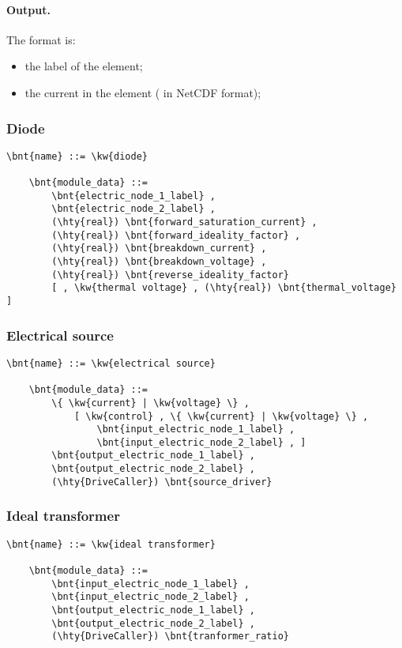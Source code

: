\paragraph{Output.}
\label{sec:MODULE:FAB-ELECTRIC:CAPACITOR:OUTPUT}
The format is:
\begin{itemize}
\item the label of the element;
\item the current in the element ( in NetCDF format);
\end{itemize}


\subsubsection{Diode}
\begin{Verbatim}[commandchars=\\\{\}]
    \bnt{name} ::= \kw{diode}

    \bnt{module_data} ::=
        \bnt{electric_node_1_label} ,
        \bnt{electric_node_2_label} ,
        (\hty{real}) \bnt{forward_saturation_current} ,
        (\hty{real}) \bnt{forward_ideality_factor} ,
        (\hty{real}) \bnt{breakdown_current} ,
        (\hty{real}) \bnt{breakdown_voltage} ,
        (\hty{real}) \bnt{reverse_ideality_factor}
        [ , \kw{thermal voltage} , (\hty{real}) \bnt{thermal_voltage} ]
\end{Verbatim}


\subsubsection{Electrical source}
\begin{Verbatim}[commandchars=\\\{\}]
    \bnt{name} ::= \kw{electrical source}

    \bnt{module_data} ::=
        \{ \kw{current} | \kw{voltage} \} ,
            [ \kw{control} , \{ \kw{current} | \kw{voltage} \} ,
                \bnt{input_electric_node_1_label} ,
                \bnt{input_electric_node_2_label} , ]
        \bnt{output_electric_node_1_label} ,
        \bnt{output_electric_node_2_label} ,
        (\hty{DriveCaller}) \bnt{source_driver}
\end{Verbatim}


\subsubsection{Ideal transformer}
\begin{Verbatim}[commandchars=\\\{\}]
    \bnt{name} ::= \kw{ideal transformer}

    \bnt{module_data} ::=
        \bnt{input_electric_node_1_label} ,
        \bnt{input_electric_node_2_label} ,
        \bnt{output_electric_node_1_label} ,
        \bnt{output_electric_node_2_label} ,
        (\hty{DriveCaller}) \bnt{tranformer_ratio}
\end{Verbatim}


